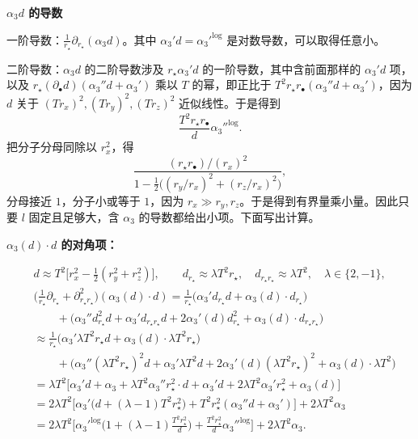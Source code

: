 
\medskip
\noindent\textbf{$\alpha_3d$ 的导数}\par
一阶导数：$\frac{1}{r_\star}\partial_{r_\star}(\alpha_3d)$。其中 $\alpha_3'd={\alpha_3'}^{\log}$ 是对数导数，可以取得任意小。

二阶导数：$\alpha_3d$ 的二阶导数涉及 $r_\star\alpha_3'd$ 的一阶导数，其中含前面那样的 $\alpha_3'd$ 项，以及 $r_\star(\partial_\bullet d)(\alpha_3''d+\alpha_3')$ 乘以 $T$ 的幂，即正比于 $T^2r_\star r_\bullet(\alpha_3''d+\alpha_3')$，因为 $d$ 关于 $(Tr_x)^2,(Tr_y)^2,(Tr_z)^2$ 近似线性。于是得到
\[
\frac{T^2r_\star r_\bullet}{d}{\alpha_3''}^{\log}.
\]
把分子分母同除以 $r_x^2$，得
\[
\frac{(r_\star r_\bullet)/(r_x)^2}{1-\frac12\big((r_y/r_x)^2+(r_z/r_x)^2\big)},
\]
分母接近 $1$，分子小或等于 $1$，因为 $r_x\gg r_y,r_z$。于是得到有界量乘小量。因此只要 $l$ 固定且足够大，含 $\alpha_3$ 的导数都给出小项。下面写出计算。

\medskip
\noindent\textbf{$\alpha_3(d)\cdot d$ 的对角项：}\par
\begin{align*}
&d\approx T^2\Big[r_x^2-\frac12(r_y^2+r_z^2)\Big],\qquad
d_{r_\star}\approx\lambda T^2r_\star,\quad d_{r_\star r_\star}\approx\lambda T^2,\quad \lambda\in\{2,-1\},\\
&\Big(\frac{1}{r_\star}\partial_{r_\star}+\partial^2_{r_\star r_\star}\Big)(\alpha_3(d)\cdot d)
=\frac{1}{r_\star}\big(\alpha_3'd_{r_\star}d+\alpha_3(d)\cdot d_{r_\star}\big)\\
&\qquad+\big(\alpha_3''d_{r_\star}^2d+\alpha_3'd_{r_\star r_\star}d+2\alpha_3'(d)d_{r_\star}^2+\alpha_3(d)\cdot d_{r_\star r_\star}\big)\\
&\approx\frac{1}{r_\star}\big(\alpha_3'\lambda T^2r_\star d+\alpha_3(d)\cdot\lambda T^2r_\star\big)\\
&\qquad+\big(\alpha_3''(\lambda T^2r_\star)^2d+\alpha_3'\lambda T^2d+2\alpha_3'(d)(\lambda T^2r_\star)^2+\alpha_3(d)\cdot\lambda T^2\big)\\
&=\lambda T^2\big[\alpha_3'd+\alpha_3+\lambda T^2\alpha_3''r_\star^2\cdot d+\alpha_3'd+2\lambda T^2\alpha_3'r_\star^2+\alpha_3(d)\big]\\
&=2\lambda T^2\big[\alpha_3'\big(d+(\lambda-1)T^2r_\star^2\big)+T^2r_\star^2(\alpha_3''d+\alpha_3')\big]+2\lambda T^2\alpha_3\\
&=2\lambda T^2\Big[{\alpha_3'}^{\log}\Big(1+(\lambda-1)\frac{T^2r_\star^2}{d}\Big)+\frac{T^2r_\star^2}{d}{\alpha_3''}^{\log}\Big]+2\lambda T^2\alpha_3.
\end{align*}

